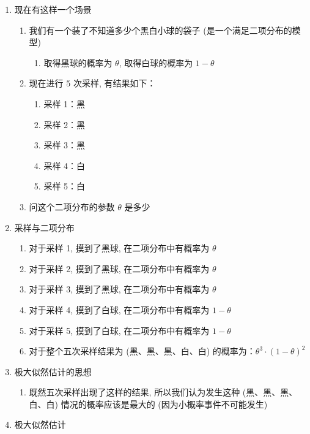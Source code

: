 \begin{enumerate}
    \item 现在有这样一个场景\begin{enumerate}
        \item 我们有一个装了不知道多少个黑白小球的袋子 (是一个满足二项分布的模型)
        \begin{enumerate}
            \item 取得黑球的概率为 $\theta$, 取得白球的概率为 $1-\theta$ 
        \end{enumerate}
        \item 现在进行 $5$ 次采样, 有结果如下：
        \begin{enumerate}
            \item  采样 1：黑
            \item  采样 2：黑
            \item  采样 3：黑
            \item  采样 4：白
            \item  采样 5：白
        \end{enumerate}
        \item 问这个二项分布的参数 $\theta$ 是多少
    \end{enumerate}
    \item 采样与二项分布
    \begin{enumerate}
        \item 对于采样 1, 摸到了黑球, 在二项分布中有概率为 $\theta$ 
        \item 对于采样 2, 摸到了黑球, 在二项分布中有概率为 $\theta$ 
        \item 对于采样 3, 摸到了黑球, 在二项分布中有概率为 $\theta$ 
        \item 对于采样 4, 摸到了白球, 在二项分布中有概率为 $1-\theta$ 
        \item 对于采样 5, 摸到了白球, 在二项分布中有概率为 $1-\theta$ 
        \item 对于整个五次采样结果为 (黑、黑、黑、白、白) 的概率为：$\theta^3\cdot(1-\theta)^2$ 
    \end{enumerate}
    \item 极大似然估计的思想
    \begin{enumerate}
        \item 既然五次采样出现了这样的结果, 所以我们认为发生这种 (黑、黑、黑、白、白) 情况的概率应该是最大的 (因为小概率事件不可能发生)
    \end{enumerate}
    \item 极大似然估计
    \begin{enumerate}

\end{enumerate}
\end{enumerate}
